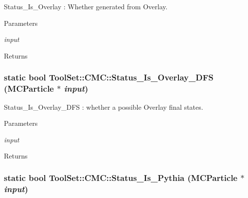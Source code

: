 Status\_\-Is\_\-Overlay : Whether generated from Overlay. 
\begin{DoxyParams}{Parameters}
\item[{\em input}]\end{DoxyParams}
\begin{DoxyReturn}{Returns}

\end{DoxyReturn}
\hypertarget{classToolSet_1_1CMC_acb83c834c9e5e1c33f8c2514e4c40d93}{
\subsubsection[{Status\_\-Is\_\-Overlay\_\-DFS}]{\setlength{\rightskip}{0pt plus 5cm}static bool ToolSet::CMC::Status\_\-Is\_\-Overlay\_\-DFS (MCParticle $\ast$ {\em input})}}
\label{classToolSet_1_1CMC_acb83c834c9e5e1c33f8c2514e4c40d93}


Status\_\-Is\_\-Overlay\_\-DFS : whether a possible Overlay final states. 
\begin{DoxyParams}{Parameters}
\item[{\em input}]\end{DoxyParams}
\begin{DoxyReturn}{Returns}

\end{DoxyReturn}
\hypertarget{classToolSet_1_1CMC_a3fbb915477cbbdca4193b8b2ff8cd356}{
\subsubsection[{Status\_\-Is\_\-Pythia}]{\setlength{\rightskip}{0pt plus 5cm}static bool ToolSet::CMC::Status\_\-Is\_\-Pythia (MCParticle $\ast$ {\em input})}}
\label{classToolSet_1_1CMC_a3fbb915477cbbdca4193b8b2ff8cd356}


